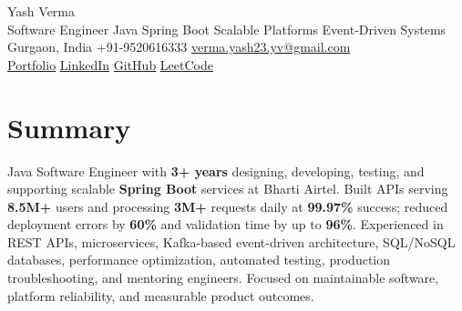 \documentclass[letterpaper,11pt]{article}
\begin{document}
\begin{center}
  {\Huge Yash Verma} \\
  \small Software Engineer \textperiodcentered{} Java \textperiodcentered{} Spring Boot \textperiodcentered{} Scalable Platforms \textperiodcentered{} Event-Driven Systems \\
  \vspace{5pt}
  \small Gurgaon, India \textbar{} +91-9520616333 \textbar{}
  \href{mailto:verma.yash23.yv@gmail.com}{verma.yash23.yv@gmail.com} \\
  \vspace{7pt}
  \href{https://yashverma230600.github.io/yashV-portfolio/}{Portfolio} \textbar{}
  \href{https://www.linkedin.com/in/yash-verma-9243a7193/}{LinkedIn} \textbar{}
  \href{https://github.com/yashverma230600}{GitHub} \textbar{}
  \href{https://leetcode.com/yashverma230600}{LeetCode}
  \vspace{-8pt}
\end{center}

\section{Summary}
\begin{itemize}[leftmargin=0.15in, label={}]
  \small{\item{
    Java Software Engineer with \textbf{3+ years} designing, developing, testing, and supporting scalable \textbf{Spring Boot} services at Bharti Airtel. Built APIs serving \textbf{8.5M+} users and processing \textbf{3M+} requests daily at \textbf{99.97\%} success; reduced deployment errors by \textbf{60\%} and validation time by up to \textbf{96\%}. Experienced in REST APIs, microservices, Kafka-based event-driven architecture, SQL/NoSQL databases, performance optimization, automated testing, production troubleshooting, and mentoring engineers. Focused on maintainable software, platform reliability, and measurable product outcomes.
  }}
\end{itemize}
\vspace{-8pt}

\end{document}
